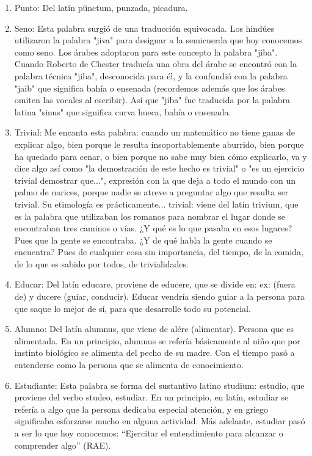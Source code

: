 \documentclass{mylib/reporte}
\begin{document}
\begin{enumerate}
	\item Punto: Del latín pŭnctum, punzada, picadura.
	\item Seno: Esta palabra surgió de una traducción equivocada. Los hindúes utilizaron la palabra "jiva" para designar a la semicuerda que hoy conocemos como seno. Los árabes adoptaron para este concepto la palabra "jiba". Cuando Roberto de Chester traducía una obra del árabe se encontró con la palabra técnica "jiba", desconocida para él, y la confundió con la palabra "jaib" que significa bahía o ensenada (recordemos además que los árabes omiten las vocales al escribir). Así que "jiba" fue traducida por la palabra latina "sinus" que significa curva hueca, bahía o ensenada.
	\item Trivial: Me encanta esta palabra: cuando un matemático no tiene ganas de explicar algo, bien porque le resulta insoportablemente aburrido, bien porque ha quedado para cenar, o bien porque no sabe muy bien cómo explicarlo, va y dice algo así como "la demostración de este hecho es trivial" o "es un ejercicio trivial demostrar que...", expresión con la que deja a todo el mundo con un palmo de narices, porque nadie se atreve a preguntar algo que resulta ser trivial. Su etimología es prácticamente... trivial: viene del latín trivium, que es la palabra que utilizaban los romanos para nombrar el lugar donde se encontraban tres caminos o vías. ¿Y qué es lo que pasaba en esos lugares? Pues que la gente se encontraba. ¿Y de qué habla la gente cuando se encuentra? Pues de cualquier cosa sin importancia, del tiempo, de la comida, de lo que es sabido por todos, de trivialidades.
	\item Educar: Del latín educare, proviene de educere, que se divide en: ex: (fuera  de) y ducere (guiar, conducir). Educar vendría siendo guiar a la persona para que saque lo mejor de sí, para que desarrolle todo su potencial.
	\item Alumno: Del latín alumnus, que viene de alére (alimentar). Persona que es alimentada. En un principio, alumnus se refería básicamente al niño que por instinto biológico se alimenta del pecho de su madre. Con el tiempo pasó a entenderse como la persona que se alimenta de conocimiento.
	\item Estudiante: Esta palabra se forma del sustantivo latino studium: estudio, que proviene del verbo studeo, estudiar. En un principio, en latín, estudiar se refería a algo que la persona dedicaba especial atención, y en griego significaba esforzarse mucho en alguna actividad. Más adelante, estudiar pasó a ser lo que hoy conocemos: “Ejercitar el entendimiento para alcanzar o comprender algo” (RAE).

\end{enumerate}
\end{document}
